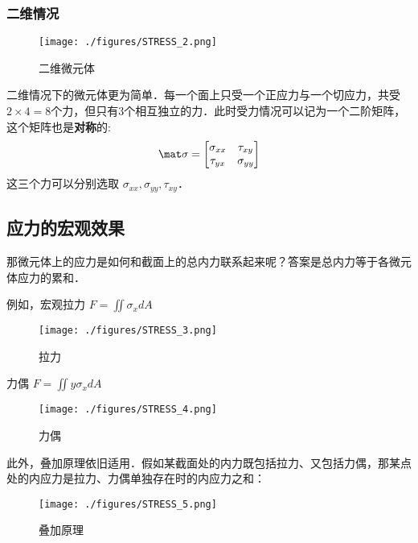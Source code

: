 \subsubsection{二维情况}
\begin{figure}[ht]
\centering
\texttt{[image: ./figures/STRESS\_2.png]}
\caption{二维微元体} \label{STRESS_fig2}
\end{figure}

二维情况下的微元体更为简单．每一个面上只受一个正应力与一个切应力，共受$2\times4=8$个力，但只有3个相互独立的力．此时受力情况可以记为一个二阶矩阵，这个矩阵也是\textbf{对称}的:
\begin{equation}
\mat \sigma=
\begin{bmatrix}
\sigma_{xx} & \tau_{xy}\\
\tau_{yx} & \sigma_{yy}\\
\end{bmatrix}
\end{equation}
这三个力可以分别选取 $\sigma_{xx}, \sigma_{yy}, \tau_{xy}$．

\subsection{应力的宏观效果}
那微元体上的应力是如何和截面上的总内力联系起来呢？答案是总内力等于各微元体应力的累和．

例如，宏观拉力 $F = \iint \sigma_x dA$
\begin{figure}[ht]
\centering
\texttt{[image: ./figures/STRESS\_3.png]}
\caption{拉力} \label{STRESS_fig3}
\end{figure}

力偶 $F = \iint y\sigma_x dA$
\begin{figure}[ht]
\centering
\texttt{[image: ./figures/STRESS\_4.png]}
\caption{力偶} \label{STRESS_fig4}
\end{figure}

此外，叠加原理依旧适用．假如某截面处的内力既包括拉力、又包括力偶，那某点处的内应力是拉力、力偶单独存在时的内应力之和：
\begin{figure}[ht]
\centering
\texttt{[image: ./figures/STRESS\_5.png]}
\caption{叠加原理} \label{STRESS_fig5}
\end{figure}
